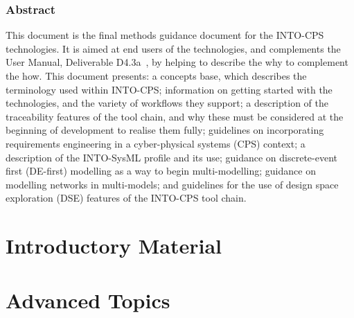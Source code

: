 \documentclass[narrowmargin,final,12pt,a4paper]{include/intocpslargereport}   %
\begin{document}
\maketitle


\section*{Abstract}
\label{sec:abstract}

This document is the final methods guidance document for the INTO-CPS technologies. It is aimed at end users of the technologies, and complements the User Manual, Deliverable D4.3a~\cite{INTOCPSD4.3a}, by helping to describe the why to complement the how. This document presents: a concepts base, which describes the terminology used within INTO-CPS; information on getting started with the technologies, and the variety of workflows they support; a description of the traceability features of the tool chain, and why these must be considered at the beginning of development to realise them fully; guidelines on incorporating requirements engineering in a cyber-physical systems (CPS) context; a description of the INTO-SysML profile and its use; guidance on discrete-event first (DE-first) modelling as a way to begin multi-modelling; guidance on modelling networks in multi-models; and guidelines for the use of design space exploration (DSE) features of the INTO-CPS tool chain.

\newpage

\tableofcontents
\newpage

\part{Introductory Material}
\label{part:intro}





\part{Advanced Topics}
\label{part:advanced}







%

\newpage


\label{ch:bib} %
\end{document}
